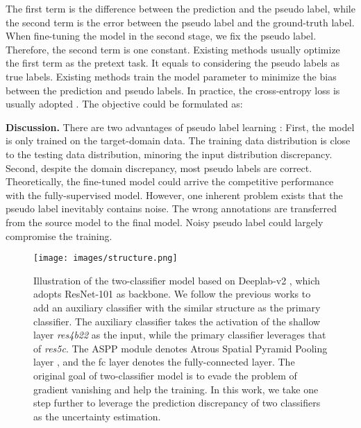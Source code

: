 The first term is the difference between the prediction and the pseudo label, while the second term is the error between the pseudo label and the ground-truth label. When fine-tuning the model in the second stage, we fix the pseudo label. Therefore, the second term is one constant. Existing methods usually optimize the first term as the pretext task. It equals to considering the pseudo labels  as true labels. Existing methods train the model parameter  to minimize the bias between the prediction and pseudo labels. In practice, the cross-entropy loss is usually adopted \cite{zou2018unsupervised,zou2019confidence,zheng2019unsupervised}. The objective could be formulated as:



\noindent\textbf{Discussion.}  There are two advantages of pseudo label learning : First, the model is only trained on the target-domain data. The training data distribution is close to the testing data distribution, minoring the input distribution discrepancy. Second, despite the domain discrepancy,  most pseudo labels are correct. Theoretically, the fine-tuned model could arrive the competitive performance with the fully-supervised model.
However, one inherent problem exists that the pseudo label inevitably contains noise. The wrong annotations are transferred from the source model to the final model. Noisy pseudo label could largely compromise the training.





\begin{figure}[t]
\begin{center}
     \texttt{[image: images/structure.png]}
\end{center} 
\vspace{-.1in}
      \caption{ Illustration of the two-classifier model based on Deeplab-v2 \cite{chen2017deeplab}, which adopts ResNet-101 \cite{he2016deep} as backbone. We follow the previous works \cite{zhao2017pyramid,tsai2018learning,tsai2019domain,luo2019significance,luo2019taking,zheng2019unsupervised} to add an auxiliary classifier with the similar structure as the primary classifier. The auxiliary classifier takes the activation of the shallow layer \emph{res4b22} as the input, while the primary classifier leverages that of \emph{res5c}.
      The ASPP module denotes Atrous Spatial Pyramid Pooling layer \cite{chen2017deeplab}, and the fc layer denotes the fully-connected layer. The original goal of two-classifier model is to evade the problem of gradient vanishing and help the training. In this work, we take one step further to leverage the prediction discrepancy of two classifiers as the uncertainty estimation.
      }
      \label{fig:structure}
\end{figure}

